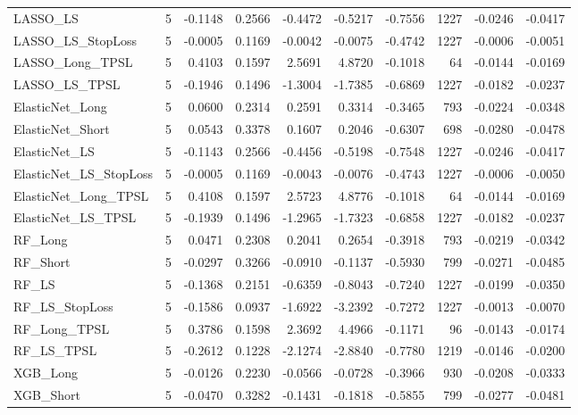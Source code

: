 \begin{tabular}{llrrrrrrrr}
\cline{1-10}
LASSO\_LS & 5 & -0.1148 & 0.2566 & -0.4472 & -0.5217 & -0.7556 & 1227 & -0.0246 & -0.0417 \\
\cline{1-10}
LASSO\_LS\_StopLoss & 5 & -0.0005 & 0.1169 & -0.0042 & -0.0075 & -0.4742 & 1227 & -0.0006 & -0.0051 \\
\cline{1-10}
LASSO\_Long\_TPSL & 5 & 0.4103 & 0.1597 & 2.5691 & 4.8720 & -0.1018 & 64 & -0.0144 & -0.0169 \\
\cline{1-10}
LASSO\_LS\_TPSL & 5 & -0.1946 & 0.1496 & -1.3004 & -1.7385 & -0.6869 & 1227 & -0.0182 & -0.0237 \\
\cline{1-10}
ElasticNet\_Long & 5 & 0.0600 & 0.2314 & 0.2591 & 0.3314 & -0.3465 & 793 & -0.0224 & -0.0348 \\
\cline{1-10}
ElasticNet\_Short & 5 & 0.0543 & 0.3378 & 0.1607 & 0.2046 & -0.6307 & 698 & -0.0280 & -0.0478 \\
\cline{1-10}
ElasticNet\_LS & 5 & -0.1143 & 0.2566 & -0.4456 & -0.5198 & -0.7548 & 1227 & -0.0246 & -0.0417 \\
\cline{1-10}
ElasticNet\_LS\_StopLoss & 5 & -0.0005 & 0.1169 & -0.0043 & -0.0076 & -0.4743 & 1227 & -0.0006 & -0.0050 \\
\cline{1-10}
ElasticNet\_Long\_TPSL & 5 & 0.4108 & 0.1597 & 2.5723 & 4.8776 & -0.1018 & 64 & -0.0144 & -0.0169 \\
\cline{1-10}
ElasticNet\_LS\_TPSL & 5 & -0.1939 & 0.1496 & -1.2965 & -1.7323 & -0.6858 & 1227 & -0.0182 & -0.0237 \\
\cline{1-10}
RF\_Long & 5 & 0.0471 & 0.2308 & 0.2041 & 0.2654 & -0.3918 & 793 & -0.0219 & -0.0342 \\
\cline{1-10}
RF\_Short & 5 & -0.0297 & 0.3266 & -0.0910 & -0.1137 & -0.5930 & 799 & -0.0271 & -0.0485 \\
\cline{1-10}
RF\_LS & 5 & -0.1368 & 0.2151 & -0.6359 & -0.8043 & -0.7240 & 1227 & -0.0199 & -0.0350 \\
\cline{1-10}
RF\_LS\_StopLoss & 5 & -0.1586 & 0.0937 & -1.6922 & -3.2392 & -0.7272 & 1227 & -0.0013 & -0.0070 \\
\cline{1-10}
RF\_Long\_TPSL & 5 & 0.3786 & 0.1598 & 2.3692 & 4.4966 & -0.1171 & 96 & -0.0143 & -0.0174 \\
\cline{1-10}
RF\_LS\_TPSL & 5 & -0.2612 & 0.1228 & -2.1274 & -2.8840 & -0.7780 & 1219 & -0.0146 & -0.0200 \\
\cline{1-10}
XGB\_Long & 5 & -0.0126 & 0.2230 & -0.0566 & -0.0728 & -0.3966 & 930 & -0.0208 & -0.0333 \\
\cline{1-10}
XGB\_Short & 5 & -0.0470 & 0.3282 & -0.1431 & -0.1818 & -0.5855 & 799 & -0.0277 & -0.0481 \\

\end{tabular}
